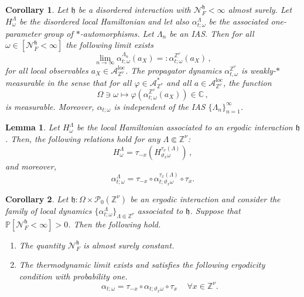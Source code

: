 \documentclass[10pt,a4paper]{amsart}
\newtheorem{cor}{Corollary}
\newtheorem{lem}{Lemma}
\newcommand{\A}{\mathcal{A}}
\newcommand{\C}{\mathbb C}
\renewcommand{\P}{\mathbb{P}}
\newcommand{\Znu}{\mathbb{Z}^\nu}
\newcommand{\aloc}{\mathcal{A}_{\mathbb{Z}^\nu}^{\loc}}
\newcommand{\calN}{\mathcal{N}^{\mathfrak{h}}_F}
\newcommand{\h}{\mathfrak{h}}
\DeclareMathOperator{\loc}{loc}
\begin{document}
\begin{cor}\label{cor:Thermo_AS}
    Let $\h$ be a disordered interaction with $\calN<\infty$ almost surely. Let $H^{\Lambda}_\omega$ be the disordered local Hamiltonian and let also $\alpha^{\Lambda}_{t;\omega}$ be the associated one-parameter group of $*$-automorphisms. Let $\Lambda_n$ be an IAS. Then for all $\omega \in [\calN<\infty]$ the following limit exists 
        \begin{equation}
            \lim_{n\to \infty} \alpha^{\Lambda_n}_{t;\omega} (a_X) =: \alpha^{\Znu}_{t;\omega}(a_X)\,,
        \end{equation} for all local observables $a_X\in \aloc$. The propagator dynamics $\alpha^{\Znu}_{t,\omega}$ is weakly-$\ast$ measurable in the sense that for all $\varphi \in \A_{\Znu}^*$ and all $a\in \aloc$, the function 
        \[
            \Omega \ni \omega \mapsto \varphi(\alpha^{\Znu}_{t;\omega}(a_X))\in \C\,,
        \] is measurable. Moreover, $\alpha_{t;\omega}$ is independent of the IAS $\{\Lambda_n\}_{n=1}^\infty$. 
\end{cor}

\begin{lem}\label{lem:local_covariance}
    Let $H^{\Lambda}_\omega$ be the local Hamiltonian associated to an ergodic interaction $\h$. Then, the following relations hold for any $\Lambda \Subset \Znu$:
        \begin{equation}
            H^{\Lambda}_{\omega} = \tau_{-x}(H^{\tau_x(\Lambda)}_{\vartheta_x \omega})\,,
        \end{equation} and moreover, 
        \begin{equation}
            \alpha^{\Lambda}_{t;\omega} = \tau_{-x} \circ \alpha^{\tau_{x}(\Lambda)}_{t;\vartheta_x \omega} \circ \tau_x. 
        \end{equation} 
\end{lem}

\begin{cor}\label{cor:N-norm_const,thermo_covariance}
    Let $\h:\Omega \times \mathscr{P}_0(\Znu)$ be an ergodic interaction and consider the family of local dynamics $\{\alpha^{\Lambda}_{t;\omega}\}_{\Lambda \Subset \Znu}$ associated to $\h$. Suppose that $\P[\calN<\infty]>0$. Then the following hold. 
    \begin{enumerate}
        \item The quantity $\calN$ is almost surely constant. 
        \item The thermodynamic limit exists and satisfies the following ergodicity condition with probability one.  
                \begin{equation}
                    \alpha_{t;\omega} = \tau_{-x} \circ \alpha _{t;\vartheta_x \omega} \circ \tau_x\, \quad \forall x\in \Znu. 
        \end{equation}  
    \end{enumerate}

\end{cor}
\end{document}
